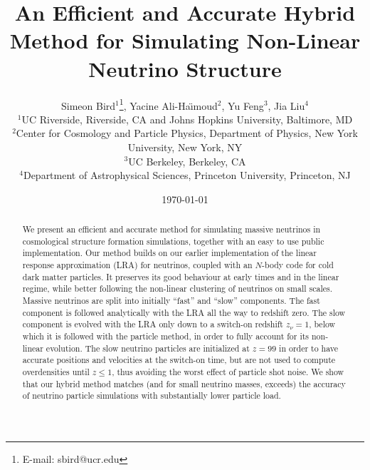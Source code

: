 \documentclass[useAMS, usenatbib]{mnras}
\begin{document}
\title{An Efficient and Accurate Hybrid Method for Simulating Non-Linear Neutrino Structure}
\author[ S. Bird et al.]{Simeon Bird$^1$\thanks{E-mail: sbird@ucr.edu}, Yacine Ali-Ha\"{\i}moud$^2$, Yu Feng$^3$, Jia Liu$^4$\vspace{1.5mm}\\
$^1$UC Riverside, Riverside, CA  and Johns Hopkins University, Baltimore, MD\\
$^2$Center for Cosmology and Particle Physics, Department of Physics,
New York University, New York, NY\\
$^3$UC Berkeley, Berkeley, CA\\
$^4$Department of Astrophysical Sciences, Princeton University, Princeton, NJ
}

\date{\today}

\pagerange{\pageref{firstpage}--\pageref{lastpage}} 
\label{firstpage}

\maketitle

\begin{abstract}
We present an efficient and accurate method for simulating massive neutrinos in cosmological structure formation simulations, together with an easy to use public implementation. Our method builds on our earlier implementation of the linear response approximation (LRA)
for neutrinos, coupled with an $N$-body code for cold dark matter particles. It preserves its good behaviour at early times and in the linear regime, while better following the non-linear clustering of neutrinos on small scales. Massive neutrinos are split into initially ``fast'' and ``slow'' components. The fast component is followed analytically with the LRA all the way to redshift zero. The slow component is evolved with the LRA only down to a switch-on redshift $z_\nu = 1$, below which it is followed with the particle method, in order to fully account for its non-linear evolution. The slow neutrino particles are initialized at $z = 99$ in order to have accurate positions and velocities at the switch-on time, but are not used to compute overdensities until $z \leq 1$, thus avoiding the worst effect of particle shot noise. We show that our hybrid method matches (and for small neutrino masses, exceeds) the accuracy of neutrino particle simulations with substantially lower particle load.
\end{abstract}
\end{document}
